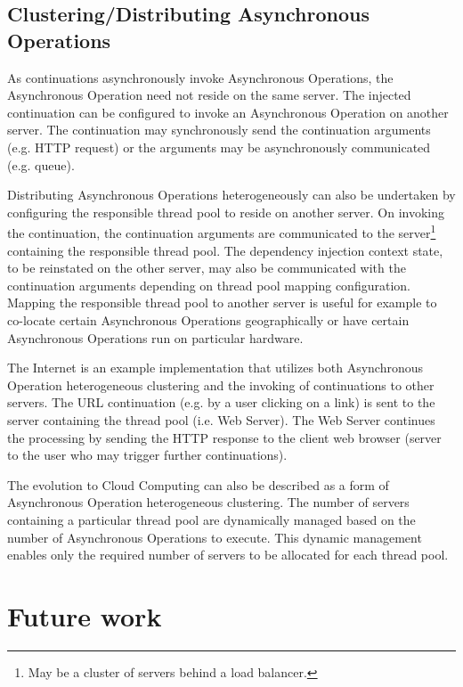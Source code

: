 \documentclass[prodmode]{style/acmlarge}
\begin{document}
\subsection{Clustering/Distributing Asynchronous Operations}

As continuations asynchronously invoke Asynchronous Operations, the Asynchronous
Operation need not reside on the same server.  The injected continuation can be
configured to invoke an Asynchronous Operation on another server.  The
continuation may synchronously send the continuation arguments (e.g. HTTP
request) or the arguments may be asynchronously communicated (e.g.
queue).

Distributing Asynchronous Operations heterogeneously can also be undertaken by
configuring the responsible thread pool to reside on another server.  On
invoking the continuation, the continuation arguments are communicated to the
server\footnote{May be a cluster of servers behind a load balancer.} containing
the responsible thread pool.  The dependency injection context state, to be
reinstated on the other server, may also be communicated with the continuation
arguments depending on thread pool mapping configuration.  Mapping the
responsible thread pool to another server is useful for example to co-locate
certain Asynchronous Operations geographically or have certain Asynchronous
Operations run on particular hardware.

The Internet is an example implementation that utilizes both Asynchronous
Operation heterogeneous clustering and the invoking of continuations to other
servers.  The URL continuation (e.g. by a user clicking on a link) is sent to
the server containing the thread pool (i.e. Web Server).  The Web Server
continues the processing by sending the HTTP response to the client web browser
(server to the user who may trigger further continuations).

The evolution to Cloud Computing can also be described as a form of Asynchronous
Operation heterogeneous clustering.  The number of servers containing a
particular thread pool are dynamically managed based on the number of
Asynchronous Operations to execute.  This dynamic management enables only the
required number of servers to be allocated for each thread pool.



\section{Future work}
\end{document}
